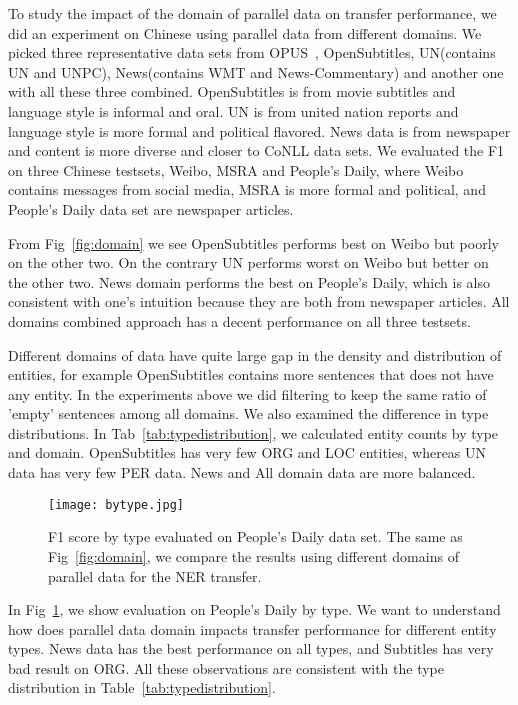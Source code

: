 \documentclass[11pt]{article}
\begin{document}
To study the impact of the domain of parallel data on transfer performance, we did an experiment on Chinese using parallel data from different domains. We picked three representative data sets from OPUS~\cite{TIEDEMANN12}, OpenSubtitles, UN(contains UN and UNPC), News(contains WMT and News-Commentary) and another one with all these three combined. OpenSubtitles is from movie subtitles and language style is informal and oral. UN is from united nation reports and language style is more formal and political flavored. News data is from newspaper and content is more diverse and closer to CoNLL data sets. We evaluated the F1 on three Chinese testsets, Weibo, MSRA and People's Daily, where Weibo contains messages from social media, MSRA is more formal and political, and People's Daily data set are newspaper articles. 

From Fig~\ref{fig:domain} we see OpenSubtitles performs best on Weibo but poorly on the other two. On the contrary UN performs worst on Weibo but better on the other two. News domain performs the best on People's Daily, which is also consistent with one's intuition because they are both from newspaper articles. All domains combined approach has a decent performance on all three testsets.

Different domains of data have quite large gap in the density and distribution of entities, for example OpenSubtitles contains more sentences that does not have any entity. In the experiments above we did filtering to keep the same ratio of 'empty' sentences among all domains. We also examined the difference in type distributions. In Tab~\ref{tab:typedistribution}, we calculated entity counts by type and domain. OpenSubtitles has very few ORG and LOC entities, whereas UN data has very few PER data. News and All domain data are more balanced.

\begin{figure}[!h]
	\centering
	\texttt{[image: bytype.jpg]}
	\caption{F1 score by type evaluated on People's Daily data set. The same as Fig~\ref{fig:domain}, we compare the results using different domains of parallel data for the NER transfer.}
	\label{fig:bytype}
\end{figure}

In Fig~\ref{fig:bytype}, we show evaluation on People's Daily by type. We want to understand how does parallel data domain impacts transfer performance for different entity types. News data has the best performance on all types, and Subtitles has very bad result on ORG. All these observations are consistent with the type distribution in Table~\ref{tab:typedistribution}.
\end{document}
